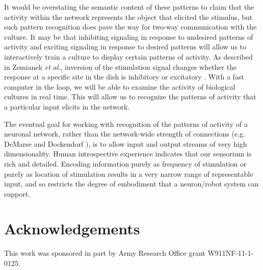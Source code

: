 \documentclass[letterpaper]{article}
\begin{document}
It would be overstating the semantic content of these patterns to claim that the activity within the network represents the object that elicited the stimulus, but such pattern recognition does pave the way for two-way communication with the culture.
It may be that inhibiting signaling in response to undesired patterns of activity and exciting signaling in response to desired patterns will allow us to interactively train a culture to display certain patterns of activity. 
As described in Zemianek \textit{et al}., inversion of the stimulation signal changes whether the response at a specific site in the dish is inhibitory or excitatory .
With a fast computer in the loop, we will be able to examine the activity of biological cultures in real time. 
This will allow us to recognize the patterns of activity that a particular input elicits in the network. 

The eventual goal for working with recognition of the patterns of activity of a neuronal network, rather than the network-wide strength of connections (e.g. DeMarse and Dockendorf ), is to allow input and output streams of very high dimensionality.
Human introspective experience indicates that our sensorium is rich and detailed.
Encoding information purely as frequency of stimulation or purely as location of stimulation results in a very narrow range of representable input, and so restricts the degree of embodiment that a neuron/robot system can support.

\section{Acknowledgements}

This work was sponsored in part by Army Research Office grant W911NF-11-1-0125.



\end{document}
